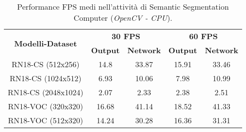 \begin{landscape}
    \begin{table}
        \centering
        \begin{adjustbox}{max width=\textwidth}
        \begin{tabular}{|c||c|c||c|c||}
            \hline
            \multirow{2}{*}{\bfseries{\Large Modelli-Dataset}} & \multicolumn{2}{c||}{\bfseries{30 FPS}} & \multicolumn{2}{c||}{\bfseries{60 FPS}}\\            & \bfseries{Output} & \bfseries{Network} & \bfseries{Output} & \bfseries{Network}\\
            \hline
            \hline
            RN18-CS (512x256) & 14.8 & 33.87 & 15.91 & 33.46\\
            \hline
            RN18-CS (1024x512) & 6.93 & 10.06 & 7.98 & 10.99\\
            \hline 
            RN18-CS (2048x1024) & 2.07 & 2.33 & 2.38 & 2.51\\
            \hline
            RN18-VOC (320x320) & 16.68 & 41.14 & 18.52 & 41.33\\
            \hline
            RN18-VOC (512x320) & 14.24 & 30.28 & 16.36 & 31.31\\
            \hline
        \end{tabular}
        \end{adjustbox}
        \vspace{0.2cm}
        \caption{Performance FPS medi nell'attività di Semantic Segmentation Computer (\emph{OpenCV - CPU}).}
        \label{average performance computer CPU sem_seg}
    \end{table}
\end{landscape}

\newpage
